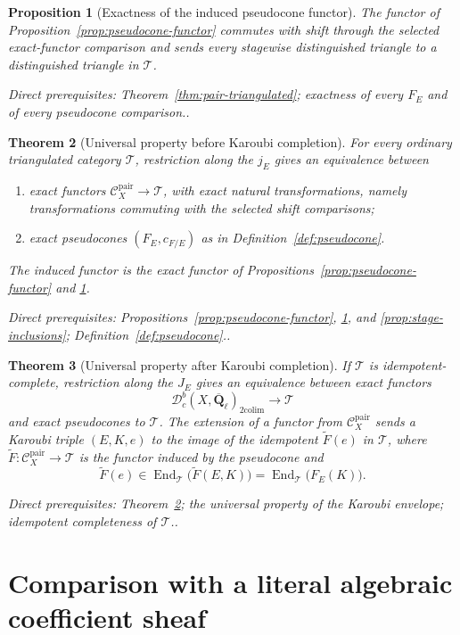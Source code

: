 \documentclass[10pt]{article}
\newtheorem{theorem}{Theorem}[section]
\newtheorem{proposition}[theorem]{Proposition}
\theoremstyle{definition}
\newcommand{\Qlb}{\overline{\mathbf Q}_\ell}
\newcommand{\Dbc}{\mathcal D^b_c}
\newcommand{\End}{\operatorname{End}}
\newcommand{\Pair}{\mathcal C_X^{\mathrm{pair}}}
\newcommand{\depends}[1]{\par\smallskip\noindent\textit{Direct prerequisites:} #1.}
\begin{document}
\begin{proposition}[Exactness of the induced pseudocone functor]
\label{prop:pseudocone-exact}
The functor of Proposition~\ref{prop:pseudocone-functor} commutes with shift
through the selected exact-functor comparison and sends every stagewise
distinguished triangle to a distinguished triangle in $\mathcal T$.
\depends{Theorem~\ref{thm:pair-triangulated}; exactness of every $F_E$ and
of every pseudocone comparison.}
\end{proposition}

\begin{theorem}[Universal property before Karoubi completion]
\label{thm:pair-universal}
For every ordinary triangulated category $\mathcal T$, restriction along
the $j_E$ gives an equivalence between
\begin{enumerate}
\item exact functors $\Pair\to\mathcal T$, with exact natural
transformations, namely transformations commuting with the selected shift
comparisons;
\item exact pseudocones $(F_E,c_{F/E})$ as in
Definition~\ref{def:pseudocone}.
\end{enumerate}
The induced functor is the exact functor of
Propositions~\ref{prop:pseudocone-functor} and
\ref{prop:pseudocone-exact}.
\depends{Propositions~\ref{prop:pseudocone-functor},
\ref{prop:pseudocone-exact}, and \ref{prop:stage-inclusions};
Definition~\ref{def:pseudocone}.}
\end{theorem}

\begin{theorem}[Universal property after Karoubi completion]
\label{thm:karoubi-universal}
If $\mathcal T$ is idempotent-complete, restriction along the $J_E$ gives
an equivalence between exact functors
\[
 \Dbc(X,\Qlb)_{\mathrm{2colim}}\longrightarrow\mathcal T
\]
and exact pseudocones to $\mathcal T$.  The extension of a functor from
$\Pair$ sends a Karoubi triple $(E,K,e)$ to the image of the idempotent
$\widetilde F(e)$ in $\mathcal T$, where
$\widetilde F:\Pair\to\mathcal T$ is the functor induced by the
pseudocone and
\[
 \widetilde F(e)\in
 \End_{\mathcal T}\bigl(\widetilde F(E,K)\bigr)
 =\End_{\mathcal T}\bigl(F_E(K)\bigr).
\]
\depends{Theorem~\ref{thm:pair-universal}; the universal property of the
Karoubi envelope; idempotent completeness of $\mathcal T$.}
\end{theorem}

\section{Comparison with a literal algebraic coefficient sheaf}
\end{document}
